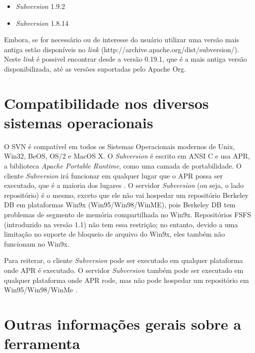   \begin{itemize}
    \item \textit{Subversion} 1.9.2 \footnotemark {}

    \item \textit{Subversion} 1.8.14 \footnotemark {}

  \end{itemize}

  Embora, se for necessário ou de interesse do usuário utilizar uma versão mais antiga estão disponíveis no \textit{link} (http://archive.apache.org/dist/subversion/). Neste \textit{link} é possivel encontrar desde a versão 0.19.1, que é a mais antiga versão disponibilizada, até as versões suportadas pelo Apache Org.

\section{Compatibilidade nos diversos sistemas operacionais}

  O SVN é compatível em todos os Sistemas Operacionais modernos de Unix, Win32, BeOS, OS/2 e MacOS X. O \textit{Subversion} é escrito em ANSI C e usa APR, a biblioteca \textit{Apache Portable Runtime}, como uma camada de portabilidade. O cliente \textit{Subversion} irá funcionar em qualquer lugar que o APR possa ser executado, que é a maioria dos lugares \cite{apache-faq}. O servidor \textit{Subversion} (ou seja, o lado repositório) é o mesmo, exceto que ele não vai hospedar um repositório Berkeley DB em plataformas Win9x (Win95/Win98/WinME), pois Berkeley DB tem problemas de segmento de memória compartilhada no Win9x. Repositórios FSFS (introduzido na versão 1.1) não tem essa restrição; no entanto, devido a uma limitação no suporte de bloqueio de arquivo do Win9x, eles também não funcionam no Win9x.

  Para reiterar, o cliente \textit{Subversion} pode ser executado em qualquer plataforma onde APR é executado. O servidor \textit{Subversion} também pode ser executado em qualquer plataforma onde APR rode, mas não pode hospedar um repositório em Win95/Win98/WinMe \cite{apache-faq}.

\section{Outras informações gerais sobre a ferramenta}
